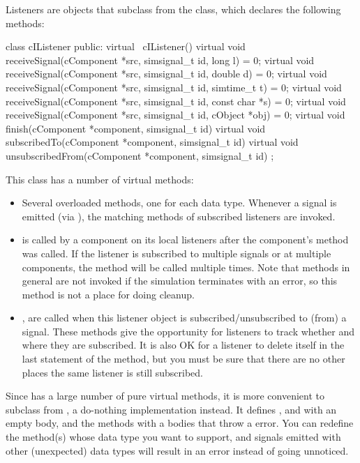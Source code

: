 Listeners are objects that subclass from the  class, which
declares the following methods:

\begin{cpp}
class cIListener
{
  public:
    virtual ~cIListener() {}
    virtual void receiveSignal(cComponent *src, simsignal_t id, long l) = 0;
    virtual void receiveSignal(cComponent *src, simsignal_t id, double d) = 0;
    virtual void receiveSignal(cComponent *src, simsignal_t id, simtime_t t) = 0;
    virtual void receiveSignal(cComponent *src, simsignal_t id, const char *s) = 0;
    virtual void receiveSignal(cComponent *src, simsignal_t id, cObject *obj) = 0;
    virtual void finish(cComponent *component, simsignal_t id) {}
    virtual void subscribedTo(cComponent *component, simsignal_t id) {}
    virtual void unsubscribedFrom(cComponent *component, simsignal_t id) {}
};
\end{cpp}

This class has a number of virtual methods:

\begin{itemize}
  \item Several overloaded  methods, one for each
    data type. Whenever a signal is emitted (via ),
    the matching  methods of subscribed listeners
    are invoked.
  \item {} is called by a component on its local listeners
    after the component's  method was called. If the listener
    is subscribed to multiple signals or at multiple components, the method
    will be called multiple times. Note that  methods in general
    are not invoked if the simulation terminates with an error, so this method
    is not a place for doing cleanup.
  \item {},  are called
    when this listener object is subscribed/unsubscribed to (from) a signal.
    These methods give the opportunity for listeners to track whether
    and where they are subscribed. It is also OK for a listener to delete
    itself in the last statement of the  method,
    but you must be sure that there are no other places the same listener
    is still subscribed.
\end{itemize}

Since  has a large number of pure virtual methods, it is more
convenient to subclass from , a do-nothing implementation
instead. It defines ,  and
 with an empty body, and the 
methods with a bodies that throw a  error.
You can redefine the  method(s) whose data type
you want to support, and signals emitted with other (unexpected) data
types will result in an error instead of going unnoticed.

